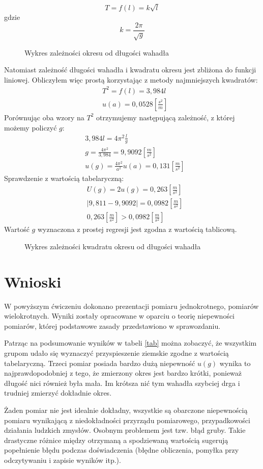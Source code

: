 \documentclass{article}
\begin{document}
$$T = f(l) = k \sqrt{l}$$
gdzie $$ k =  \frac{2 \pi}{\sqrt{g}} $$
\begin{figure}[H]
	\noindent{}
	\caption{Wykres zależności okresu od długości wahadła}
\end{figure}

Natomiast zależność długości wahadła i kwadratu okresu jest zbliżona do funkcji liniowej. Obliczyłem więc prostą korzystając z metody najmniejszych kwadratów:
\begin{align*}
&	T^2 = f(l) = 3,984  l \\
&	u(a) = 0,0528 \left[\frac{s^2}{m}\right]
\end{align*}
Porównując oba wzory na $T^2$ otrzymujemy następującą zależność, z której możemy policzyć $g$:
\begin{align*}
& 3,984  l = 4 \pi ^2 \frac{l}{g} \\
& g =  \frac{4 \pi ^2}{ 3,984} = 9,9092 \left[\frac{m}{s^2}\right] \\
& u(g) = \frac{4 \pi ^2 }{a^2}u(a) = 0,131 \left[\frac{m}{s^2}\right] \end{align*}
Sprawdzenie z wartością tabelaryczną:
\begin{align*}
& U(g) = 2u(g) = 0,263 \left[\frac{m}{s^2}\right] \\
&\left|9,811-9,9092\right| =0,0982\left[\frac{m}{s^2}\right] \\
& 0,263 \left[\frac{m}{s^2}\right] > 0,0982 \left[\frac{m}{s^2}\right]
\end{align*}
Wartość $g$ wyznaczona z prostej regresji jest zgodna z wartością tablicową.

\begin{figure}[H]
	\noindent{}
	\caption{Wykres zależności kwadratu okresu od długości wahadła}
\end{figure}

 \section{Wnioski}
 
 W powyższym ćwiczeniu dokonano prezentacji pomiaru jednokrotnego, pomiarów wielokrotnych. Wyniki zostały opracowane w oparciu o teorię niepewności pomiarów, której podstawowe zasady przedstawiono w sprawozdaniu. 

	Patrząc na podsumowanie wyników w tabeli \ref{tab} można zobaczyć, że wszystkim grupom udało się wyznaczyć przyspieszenie ziemskie zgodne z wartością tabelaryczną. Trzeci pomiar posiada bardzo dużą niepewność $u(g)$ wynika to najprawdopodobniej z tego, że zmierzony okres jest bardzo krótki, ponieważ długość nici również była  mała. Im krótsza nić tym wahadła szybciej drga i trudniej zmierzyć dokładnie okres.

	Żaden pomiar nie jest idealnie dokładny, wszystkie są obarczone niepewnością pomiaru wynikającą z niedokładności przyrządu pomiarowego, przypadkowości działania ludzkich zmysłów.
	Osobnym problemem jest tzw. błąd gruby. Takie drastyczne różnice między otrzymaną a spodziewaną wartością sugerują popełnienie błędu podczas doświadczenia (błędne obliczenia, pomyłka przy odczytywaniu i zapisie wyników itp.).
\end{document}
